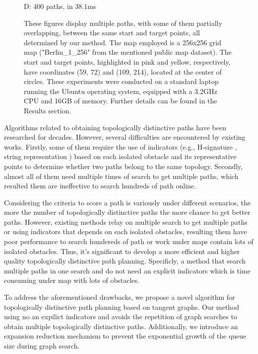 \documentclass[letterpaper, 10 pt, journal, twoside]{IEEEtran}
\begin{document}
\begin{figure}[t]
\begin{minipage}{.48\linewidth}
  \centerline{D: 400 paths, in 38.1ms}
\end{minipage}
\vfill
\caption{These figures display multiple paths, with some of them partially overlapping, between the same start and target points, all determined by our method. The map employed is a 256x256 grid map ("Berlin\_1\_256" from the mentioned public map dataset). The start and target points, highlighted in pink and yellow, respectively, have coordinates (59, 72) and (109, 214), located at the center of circles. These experiments were conducted on a standard laptop running the Ubuntu operating system, equipped with a 3.2GHz CPU and 16GB of memory. Further details can be found in the Results section. }
\label{examples}
\end{figure}


Algorithms related to obtaining topologically distinctive paths have been researched for decades. However, several difficulties are encountered by existing works. Firstly, some of them require the use of indicators (e.g., H-signature \cite{2, 3}, string representation \cite{yi2017topology}) based on each isolated obstacle and its representative points to determine whether two paths belong to the same topology. Secondly, almost all of them need multiple times of search to get multiple paths, which resulted them are ineffective to search hundreds of path online.

Considering the criteria to score a path is variously under different scenarios, the more the number of topologically distinctive paths the more chance to get better paths. However, existing methods relay on multiple search to get multiple paths or using indicators that depends on each isolated obstacles, resulting them have poor performance to search hundereds of path or work under maps contain lots of isolated obstacles. Thus, it's significant to develop a more efficient and higher quality topologically distinctive path planning. Specificly, a method that search multiple paths in one search and do not need an explicit indicators which is time consuming under map with lots of obstacles.

To address the aforementioned drawbacks, we propose a novel algorithm for topologically distinctive path planning based on tangent graphs. Our method using  no an expilict indicators and avoids the repetition of graph searches to obtain multiple topologically distinctive paths. Additionally, we introduce an expansion reduction mechanism to prevent the exponential growth of the queue size during graph search.
\end{document}
